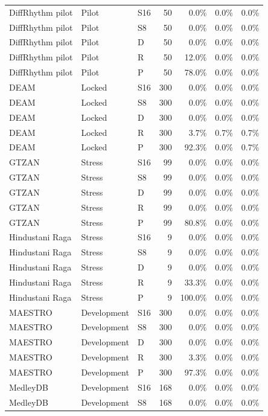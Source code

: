 \begin{longtable}{lllrrrr}
DiffRhythm pilot & Pilot & S16 & 50 & 0.0\% & 0.0\% & 0.0\% \\
DiffRhythm pilot & Pilot & S8 & 50 & 0.0\% & 0.0\% & 0.0\% \\
DiffRhythm pilot & Pilot & D & 50 & 0.0\% & 0.0\% & 0.0\% \\
DiffRhythm pilot & Pilot & R & 50 & 12.0\% & 0.0\% & 0.0\% \\
DiffRhythm pilot & Pilot & P & 50 & 78.0\% & 0.0\% & 0.0\% \\
DEAM & Locked & S16 & 300 & 0.0\% & 0.0\% & 0.0\% \\
DEAM & Locked & S8 & 300 & 0.0\% & 0.0\% & 0.0\% \\
DEAM & Locked & D & 300 & 0.0\% & 0.0\% & 0.0\% \\
DEAM & Locked & R & 300 & 3.7\% & 0.7\% & 0.7\% \\
DEAM & Locked & P & 300 & 92.3\% & 0.0\% & 0.7\% \\
GTZAN & Stress & S16 & 99 & 0.0\% & 0.0\% & 0.0\% \\
GTZAN & Stress & S8 & 99 & 0.0\% & 0.0\% & 0.0\% \\
GTZAN & Stress & D & 99 & 0.0\% & 0.0\% & 0.0\% \\
GTZAN & Stress & R & 99 & 0.0\% & 0.0\% & 0.0\% \\
GTZAN & Stress & P & 99 & 80.8\% & 0.0\% & 0.0\% \\
Hindustani Raga & Stress & S16 & 9 & 0.0\% & 0.0\% & 0.0\% \\
Hindustani Raga & Stress & S8 & 9 & 0.0\% & 0.0\% & 0.0\% \\
Hindustani Raga & Stress & D & 9 & 0.0\% & 0.0\% & 0.0\% \\
Hindustani Raga & Stress & R & 9 & 33.3\% & 0.0\% & 0.0\% \\
Hindustani Raga & Stress & P & 9 & 100.0\% & 0.0\% & 0.0\% \\
MAESTRO & Development & S16 & 300 & 0.0\% & 0.0\% & 0.0\% \\
MAESTRO & Development & S8 & 300 & 0.0\% & 0.0\% & 0.0\% \\
MAESTRO & Development & D & 300 & 0.0\% & 0.0\% & 0.0\% \\
MAESTRO & Development & R & 300 & 3.3\% & 0.0\% & 0.0\% \\
MAESTRO & Development & P & 300 & 97.3\% & 0.0\% & 0.0\% \\
MedleyDB & Development & S16 & 168 & 0.0\% & 0.0\% & 0.0\% \\
MedleyDB & Development & S8 & 168 & 0.0\% & 0.0\% & 0.0\% \\

\end{longtable}
